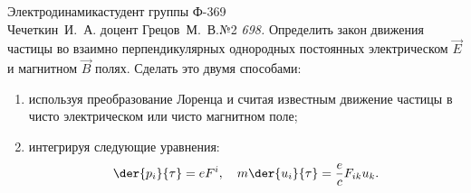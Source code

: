 




\usepackage{mathrsfs}

\newcommand{\ds}{\displaystyle}
\newcommand{\inv}{\mathrm{inv}}
\renewcommand{\v}{\mathrm{v}}
\newcommand{\E}{\mathscr{E}}


{Электродинамика}{студент группы Ф-369\\Чечеткин~И.~А.}
{доцент Грецов~М.~В.}{№2}
\emph{698.} Определить закон движения частицы во взаимно перпендикулярных
однородных постоянных электрическом \( \vec{E} \) и магнитном \( \vec{B} \)
полях. Сделать это двумя способами:
\vspace*{-1em}
\begin{enumerate}\itemsep-.5em
    \item используя преобразование Лоренца и считая известным движение частицы в
    чисто электрическом или чисто магнитном поле;
    \item интегрируя следующие уравнения:
    \begin{equation}
        \der{p_i}{\tau} = eF^i, \quad
        m\der{u_i}{\tau} = \frac{e}{c}F_{ik}u_k.
        \label{eq:1_task}
    \end{equation}
\end{enumerate}

